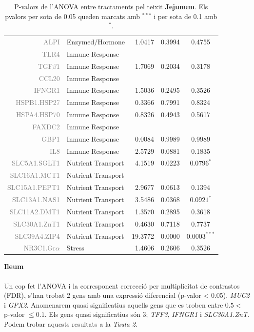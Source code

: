 \documentclass[english]{article}
\begin{document}
\begin{table}[ht]
\begin{tabular}{rlrrc}
  {\textcolor{gray}{ALPI}} & Enzymed/Hormone & 1.0417 & 0.3994 & 0.4755 \\
  {\textcolor{gray}{TLR4}} & Inmune Response &  &  &  \\
  {\textcolor{gray}{TGF$\beta1$}} & Inmune Response & 1.7069 & 0.2034 & 0.3178 \\
  {\textcolor{gray}{CCL20}} & Inmune Response &  &  &  \\
  {\textcolor{gray}{IFNGR1}} & Inmune Response & 1.5036 & 0.2495 & 0.3526 \\
  {\textcolor{gray}{HSPB1.HSP27}} & Inmune Response & 0.3366 & 0.7991 & 0.8324 \\
  {\textcolor{gray}{HSPA4.HSP70}} & Inmune Response & 0.8326 & 0.4943 & 0.5617 \\
  {\textcolor{gray}{FAXDC2}} & Inmune Response &  &  &  \\
  {\textcolor{gray}{GBP1}} & Inmune Response & 0.0084 & 0.9989 & 0.9989 \\
  {\textcolor{gray}{IL8}} & Inmune Response & 2.5729 & 0.0881 & 0.1835 \\
  {\textcolor{gray}{SLC5A1.SGLT1}} & Nutrient Transport & 4.1519 & 0.0223 & $0.0796^{*}$  \\
  {\textcolor{gray}{SLC16A1.MCT1}} & Nutrient Transport &  &  &  \\
  {\textcolor{gray}{SLC15A1.PEPT1}} & Nutrient Transport & 2.9677 & 0.0613 & 0.1394 \\
  {\textcolor{gray}{SLC13A1.NAS1}} & Nutrient Transport & 3.5486 & 0.0368 & $0.0921^{*}$  \\
  {\textcolor{gray}{SLC11A2.DMT1}} & Nutrient Transport & 1.3570 & 0.2895 & 0.3618 \\
  {\textcolor{gray}{SLC30A1.ZnT1}} & Nutrient Transport & 0.4630 & 0.7118 & 0.7737 \\
  {\textcolor{gray}{SLC39A4.ZIP4}} & Nutrient Transport & 19.3772 & 0.0000 & $0.0003^{***}$ \\
  {\textcolor{gray}{NR3C1.Gr$\alpha$}} & Stress & 1.4606 & 0.2606 & 0.3526 \\
   \bottomrule
\end{tabular}
\caption{P-valors de l'ANOVA entre tractaments pel teixit \textbf{Jejunum}. Els pvalors per sota de 0.05 queden marcats amb $^{***}$ i per sota de 0.1 amb $^{*}$.}
\end{table}
\noindent\textbf{Ileum}\\
\\
Un cop fet l'ANOVA i la corresponent correcció per multiplicitat de contrastos (FDR), s'han trobat 2 gens amb una expressió diferencial (p-valor < 0.05), \textit{MUC2} i \textit{GPX2}. Anomenarem quasi significatius aquells gens que es troben entre $0.5 <$ p-valor $\leq 0.1$. Els gens quasi significatius són 3; \textit{TFF3}, \textit{IFNGR1} i \textit{SLC30A1.ZnT}. Podem trobar aquests resultats a la \textit{Taula 2}.\\
\end{document}
